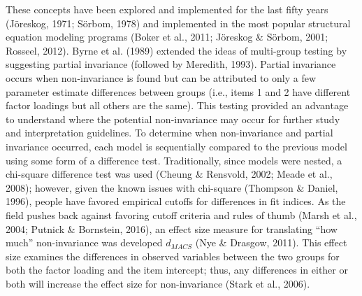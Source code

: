 \documentclass[
  man]{apa7}
\begin{document}
These concepts have been explored and implemented for the last fifty years (Jöreskog, 1971; Sörbom, 1978) and implemented in the most popular structural equation modeling programs (Boker et al., 2011; Jöreskog \& Sörbom, 2001; Rosseel, 2012). Byrne et al. (1989) extended the ideas of multi-group testing by suggesting partial invariance (followed by Meredith, 1993). Partial invariance occurs when non-invariance is found but can be attributed to only a few parameter estimate differences between groups (i.e., items 1 and 2 have different factor loadings but all others are the same). This testing provided an advantage to understand where the potential non-invariance may occur for further study and interpretation guidelines. To determine when non-invariance and partial invariance occurred, each model is sequentially compared to the previous model using some form of a difference test. Traditionally, since models were nested, a chi-square difference test was used (Cheung \& Rensvold, 2002; Meade et al., 2008); however, given the known issues with chi-square (Thompson \& Daniel, 1996), people have favored empirical cutoffs for differences in fit indices. As the field pushes back against favoring cutoff criteria and rules of thumb (Marsh et al., 2004; Putnick \& Bornstein, 2016), an effect size measure for translating ``how much'' non-invariance was developed \(d_{MACS}\) (Nye \& Drasgow, 2011). This effect size examines the differences in observed variables between the two groups for both the factor loading and the item intercept; thus, any differences in either or both will increase the effect size for non-invariance (Stark et al., 2006).
\end{document}
